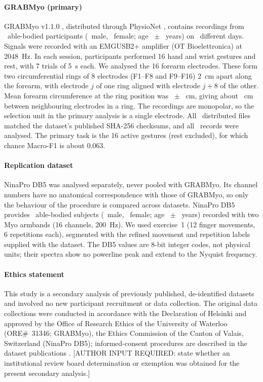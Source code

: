 \paragraph{GRABMyo (primary)}
GRABMyo v1.1.0 \citep{pradhan2022multiday,jiang2024grabmyo}, distributed through PhysioNet \citep{goldberger2000physionet}, contains recordings from \GRABMyoParticipants\ able-bodied participants (\GRABMyoMale\ male, \GRABMyoFemale\ female; age \GRABMyoAgeMean\ $\pm$ \GRABMyoAgeSD\ years) on \GRABMyoSessions\ different days. Signals were recorded with an EMGUSB2+ amplifier (OT Bioelettronica) at 2048~Hz. In each session, participants performed 16 hand and wrist gestures and rest, with 7 trials of 5~s each. We analysed the 16 forearm electrodes. These form two circumferential rings of 8 electrodes (F1--F8 and F9--F16) 2~cm apart along the forearm, with electrode $j$ of one ring aligned with electrode $j+8$ of the other. Mean forearm circumference at the ring position was \GRABMyoCircMean\ $\pm$ \GRABMyoCircSD~cm, giving about \GRABMyoArcSpacing~cm between neighbouring electrodes in a ring. The recordings are monopolar, so the selection unit in the primary analysis is a single electrode. All \GRABMyoFilesVerified\ distributed files matched the dataset's published SHA-256 checksums, and all \GRABMyoRecords\ records were analysed. The primary task is the 16 active gestures (rest excluded), for which chance Macro-F1 is about 0.063.

\paragraph{Replication dataset}
NinaPro DB5 was analysed separately, never pooled with GRABMyo. Its channel numbers have no anatomical correspondence with those of GRABMyo, so only the behaviour of the procedure is compared across datasets.
NinaPro DB5 \citep{pizzolato2017comparison} provides \DBFiveSubjects\ able-bodied subjects (\DBFiveMale\ male, \DBFiveFemale\ female; age \DBFiveAgeMean\ $\pm$ \DBFiveAgeSD\ years) recorded with two Myo armbands (16 channels, 200~Hz). We used exercise~1 (12 finger movements, 6 repetitions each), segmented with the refined movement and repetition labels supplied with the dataset. The DB5 values are 8-bit integer codes, not physical units; their spectra show no powerline peak and extend to the Nyquist frequency.

\paragraph{Ethics statement}
This study is a secondary analysis of previously published, de-identified datasets and involved no new participant recruitment or data collection. The original data collections were conducted in accordance with the Declaration of Helsinki and approved by the Office of Research Ethics of the University of Waterloo (ORE\#~31346; GRABMyo), the Ethics Commission of the Canton of Valais, Switzerland (NinaPro DB5); informed-consent procedures are described in the dataset publications \citep{pradhan2022multiday,pizzolato2017comparison}. [AUTHOR INPUT REQUIRED: state whether an institutional review board determination or exemption was obtained for the present secondary analysis.]

